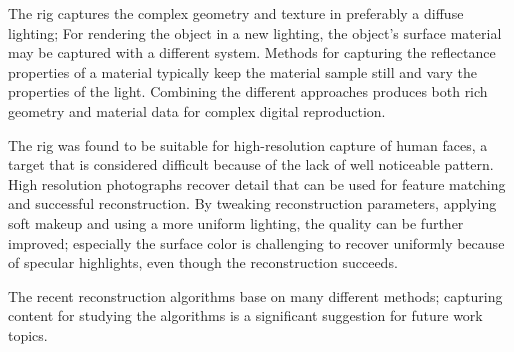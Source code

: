 The rig captures the complex geometry and texture in preferably a diffuse lighting;
For rendering the object in a new lighting, the object's surface material may be captured with a different system.
Methods for capturing the reflectance properties of a material typically keep the material sample still and vary the properties of the light. \cite{debevec2000acquiring} \cite{aittala2013practical}
Combining the different approaches produces both rich geometry and material data for complex digital reproduction.




The rig was found to be suitable for high-resolution capture of human faces, a target that is considered difficult because of the lack of well noticeable pattern.
High resolution photographs recover detail that can be used for feature matching and successful reconstruction.
By tweaking reconstruction parameters, applying soft makeup and using a more uniform lighting, the quality can be further improved;
especially the surface color is challenging to recover uniformly because of specular highlights, even though the reconstruction succeeds.

The recent reconstruction algorithms base on many different methods; capturing content for studying the algorithms is a significant suggestion for future work topics.

